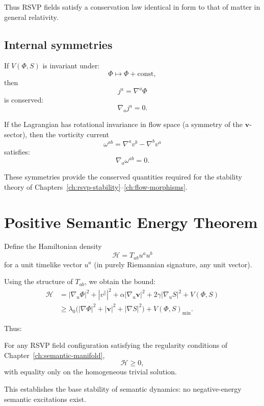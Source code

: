 Thus RSVP fields satisfy a conservation law identical in form to that of matter in general relativity.

\subsection{Internal symmetries}

If $V(\Phi,S)$ is invariant under:
\[
\Phi \mapsto \Phi + \text{const},
\]
then
\[
j^a = \nabla^a \Phi
\]
is conserved:
\[
\nabla_a j^a = 0.
\]

If the Lagrangian has rotational invariance in flow space (a symmetry of the $\mathbf{v}$-sector), then the vorticity current
\[
\omega^{ab} = \nabla^a v^b - \nabla^b v^a
\]
satisfies:
\[
\nabla_a \omega^{ab} = 0.
\]

These symmetries provide the conserved quantities required for the stability theory of Chapters~\ref{ch:rsvp-stability}–\ref{ch:flow-morphisms}.

\section{Positive Semantic Energy Theorem}

Define the Hamiltonian density
\[
\mathcal{H} = T_{ab} u^a u^b
\]
for a unit timelike vector $u^a$ (in purely Riemannian signature, any unit vector).

Using the structure of $T_{ab}$, we obtain the bound:
\begin{align}
\mathcal{H}
&= |\nabla_u \Phi|^2
 + |v^\parallel|^2
 + \alpha |\nabla_u \mathbf{v}|^2
 + 2\gamma |\nabla_u S|^2
 + V(\Phi,S) \\
&\ge \lambda_0 \big(|\nabla\Phi|^2 + |\mathbf{v}|^2 + |\nabla S|^2\big)
 + V(\Phi,S)_{\min}.
\end{align}

Thus:

\begin{theorem}
For any RSVP field configuration satisfying the regularity conditions of Chapter~\ref{ch:semantic-manifold},
\[
\mathcal{H} \ge 0,
\]
with equality only on the homogeneous trivial solution.
\end{theorem}

This establishes the base stability of semantic dynamics: no negative-energy semantic excitations exist.

